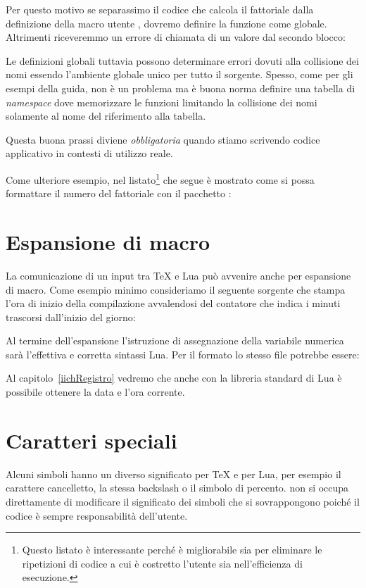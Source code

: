 Per questo motivo se separassimo il codice che calcola il fattoriale dalla
definizione della macro utente , dovremo definire la funzione
come globale. Altrimenti riceveremmo un errore di chiamata di un valore
 dal secondo blocco:

Le definizioni globali tuttavia possono determinare errori dovuti alla
collisione dei nomi essendo l'ambiente globale unico per tutto il sorgente.
Spesso, come per gli esempi della guida, non è un problema ma è buona norma
definire una tabella di \emph{namespace} dove memorizzare le funzioni limitando
la collisione dei nomi solamente al nome del riferimento alla tabella.

Questa buona prassi diviene \emph{obbligatoria} quando stiamo scrivendo codice
applicativo in contesti di utilizzo reale.

Come ulteriore esempio, nel listato\footnote{Questo listato è interessante
perché è migliorabile sia per eliminare le ripetizioni di codice a cui è
costretto l'utente sia nell'efficienza di esecuzione.} che segue è mostrato come
si possa formattare il numero del fattoriale con il pacchetto
: 


\section{Espansione di macro}

La comunicazione di un input tra \TeX{} e Lua può avvenire anche per espansione
di macro. Come esempio minimo consideriamo il seguente sorgente \LuaTeX{} che
stampa l'ora di inizio della compilazione avvalendosi del contatore 
che indica i minuti trascorsi dall'inizio del giorno:

Al termine dell'espansione l'istruzione di assegnazione della variabile numerica
 sarà l'effettiva e corretta sintassi Lua. Per il formato \LuaLaTeX{}
lo stesso file potrebbe essere:

Al capitolo~\ref{iichRegistro} vedremo che anche con la libreria standard di Lua
è possibile ottenere la data e l'ora corrente.


\section{Caratteri speciali}

Alcuni simboli hanno un diverso significato per \TeX{} e per Lua, per esempio il
carattere cancelletto, la stessa backslash o il simbolo di percento. \LuaTeX{}
non si occupa direttamente di modificare il significato dei simboli che si
sovrappongono poiché il codice è sempre responsabilità dell'utente.


